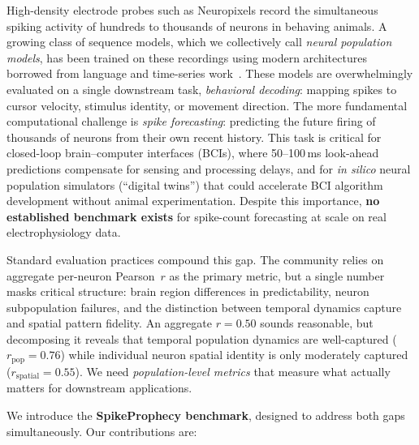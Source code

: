 \documentclass{article}
\begin{document}
High-density electrode probes such as Neuropixels record the
simultaneous spiking activity of hundreds to thousands of neurons in
behaving animals.  A growing class of sequence models, which we
collectively call \emph{neural population models}, has been trained
on these recordings using modern architectures borrowed from
language and time-series
work~\citep{pandarinath2018lfads, ye2021ndt, azabou2023poyo}.  These
models are overwhelmingly evaluated on a single downstream task,
\emph{behavioral decoding}: mapping spikes to cursor velocity, stimulus
identity, or movement direction.  The more fundamental computational
challenge is \emph{spike forecasting}: predicting the future firing of
thousands of neurons from their own recent history.  This task is critical
for closed-loop brain--computer interfaces (BCIs), where 50--100\,ms
look-ahead predictions compensate for sensing and processing delays, and
for \emph{in silico} neural population simulators (``digital twins'') that
could accelerate BCI algorithm development without animal experimentation.
Despite this importance, \textbf{no established benchmark exists} for
spike-count forecasting at scale on real electrophysiology data.

Standard evaluation practices compound this gap.  The community relies on
aggregate per-neuron Pearson~$r$ as the primary metric, but a single number
masks critical structure: brain region differences in predictability, neuron
subpopulation failures, and the distinction between temporal dynamics capture
and spatial pattern fidelity.  An aggregate $r = 0.50$ sounds reasonable,
but decomposing it reveals that temporal population dynamics are
well-captured ($r_\mathrm{pop} = 0.76$) while individual neuron spatial
identity is only moderately captured ($r_\mathrm{spatial} = 0.55$).
We need \emph{population-level metrics} that measure what actually matters
for downstream applications.

We introduce the \textbf{SpikeProphecy benchmark}, designed to address
both gaps simultaneously.  Our contributions are:
\end{document}

